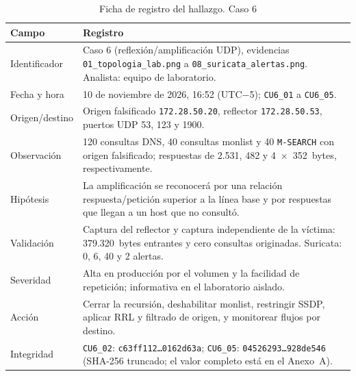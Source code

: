 \begin{table}[H]
	\centering
	\caption{Ficha de registro del hallazgo. Caso 6}
	\footnotesize
	\renewcommand{\arraystretch}{1.2}
	\begin{tabularx}{\textwidth}{@{}>{\raggedright\arraybackslash}p{} Y@{}}
		\toprule
		\textbf{Campo} & \textbf{Registro} \\ \midrule
		Identificador & Caso 6 (reflexión/amplificación UDP), evidencias \texttt{01\_topologia\_lab.png} a \texttt{08\_suricata\_alertas.png}. Analista: equipo de laboratorio. \\ \hline
		Fecha y hora & 10 de noviembre de 2026, 16:52 (UTC$-$5); \texttt{CU6\_01} a \texttt{CU6\_05}. \\ \hline
		Origen/destino & Origen falsificado \texttt{172.28.50.20}, reflector \texttt{172.28.50.53}, puertos UDP 53, 123 y 1900. \\ \hline
		Observación & 120 consultas DNS, 40 consultas monlist y 40 \texttt{M-SEARCH} con origen falsificado; respuestas de 2.531, 482 y 4~$\times$~352~bytes, respectivamente. \\ \hline
		Hipótesis & La amplificación se reconocerá por una relación respuesta/petición superior a la línea base y por respuestas que llegan a un host que no consultó. \\ \hline
		Validación & Captura del reflector y captura independiente de la víctima: 379.320~bytes entrantes y cero consultas originadas. Suricata: 0, 6, 40 y 2 alertas. \\ \hline
		Severidad & Alta en producción por el volumen y la facilidad de repetición; informativa en el laboratorio aislado. \\ \hline
		Acción & Cerrar la recursión, deshabilitar monlist, restringir SSDP, aplicar RRL y filtrado de origen, y monitorear flujos por destino. \\ \hline
		Integridad & \texttt{CU6\_02}: \texttt{c63ff112\dots0162d63a}; \texttt{CU6\_05}: \texttt{04526293\dots928de546} (SHA-256 truncado; el valor completo está en el Anexo~A). \\
		\bottomrule
	\end{tabularx}
\end{table}
